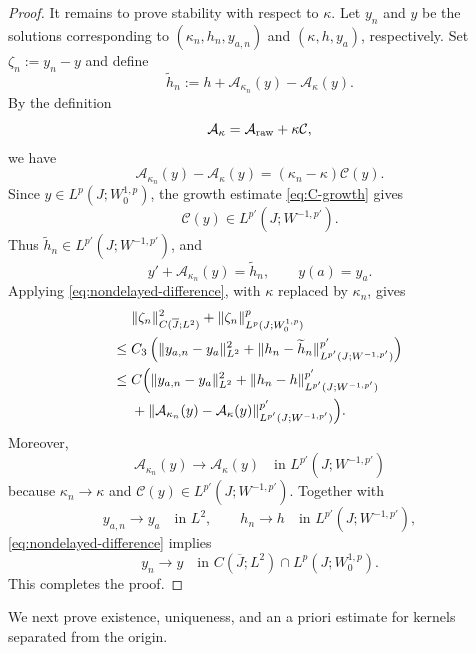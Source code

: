 \documentclass[a4paper,11pt,oneside,reqno]{amsart}
\newcounter{c}
\newcounter{d}
\newcounter{b}
\begin{document}
\begin{proof}
It remains to prove stability with respect to \(\kappa\). Let \(y_n\) and
\(y\) be the solutions corresponding to \((\kappa_n,h_n,y_{a,n})\) and
\((\kappa,h,y_a)\), respectively. Set \(\zeta_n:=y_n-y\) and define
\[
 \widetilde h_n
 :=
 h+\mathcal A_{\kappa_n}(y)-\mathcal A_\kappa(y).
\]
By the definition
\[
 \mathcal A_\kappa=\mathcal A_{\rm raw}+\kappa\mathcal C,
\]
we have
\[
 \mathcal A_{\kappa_n}(y)-\mathcal A_\kappa(y)
 =
 (\kappa_n-\kappa)\mathcal C(y).
\]
Since \(y\in L^p(J;W^{1,p}_0)\), the growth estimate
\eqref{eq:C-growth} gives
\[
 \mathcal C(y)\in L^{p'}(J;W^{-1,p'}).
\]
Thus \(\widetilde h_n\in L^{p'}(J;W^{-1,p'})\), and
\[
 y'
 +\mathcal A_{\kappa_n}(y)
 =
 \widetilde h_n,
 \qquad
 y(a)=y_a.
\]
Applying \eqref{eq:nondelayed-difference}, with \(\kappa\) replaced by
\(\kappa_n\), gives
\begin{align*}
 &\|\zeta_n\|_{C(\overline J;L^2)}^2
 +\|\zeta_n\|_{L^p(J;W^{1,p}_0)}^p\\
 \le{}&
 C_3 \left(
 \|y_{a,n}-y_a\|_{L^2}^2
 +\|h_n-\widetilde h_n\|_{L^{p'}(J;W^{-1,p'})}^{p'}
 \right)\\
 \le{}&
 C\Bigl(
 \|y_{a,n}-y_a\|_{L^2}^2
 +\|h_n-h\|_{L^{p'}(J;W^{-1,p'})}^{p'}\\
 &
 +\|\mathcal A_{\kappa_n}(y)-\mathcal A_\kappa(y)\|_{L^{p'}(J;W^{-1,p'})}^{p'}
 \Bigr).
\end{align*}
Moreover,
\[
 \mathcal A_{\kappa_n}(y)\to\mathcal A_\kappa(y)
 \quad\text{in }L^{p'}(J;W^{-1,p'})
\]
because \(\kappa_n\to\kappa\) and \(\mathcal C(y)\in L^{p'}(J;W^{-1,p'})\).
Together with
\[
 y_{a,n}\to y_a \quad\text{in }L^2,
 \qquad
 h_n\to h \quad\text{in }L^{p'}(J;W^{-1,p'}),
\]
\eqref{eq:nondelayed-difference} implies
\[
 y_n\to y
 \quad\text{in }
 C(\overline J;L^2)\cap L^p(J;W^{1,p}_0).
\]
This completes the proof.
\end{proof}

We next prove existence, uniqueness, and an a priori estimate for kernels
separated from the origin.
\end{document}
